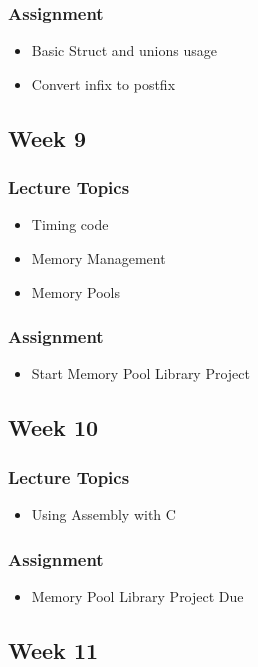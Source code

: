 \documentclass[a4paper,12pt]{report}
\begin{document}
\subsubsection*{Assignment}
\begin{itemize}
\item Basic Struct and unions usage
\item Convert infix to postfix 
\end{itemize}

\subsection*{Week 9}
\subsubsection*{Lecture Topics}
\begin{itemize}
\item Timing code
\item Memory Management
\item Memory Pools
\end{itemize}
\subsubsection*{Assignment}
\begin{itemize}
\item Start Memory Pool Library Project
\end{itemize}

\subsection*{Week 10}
\subsubsection*{Lecture Topics}
\begin{itemize}
\item Using Assembly with C
\end{itemize}
\subsubsection*{Assignment}
\begin{itemize}
\item Memory Pool Library Project Due
\end{itemize}

\subsection*{Week 11}
\end{document}
